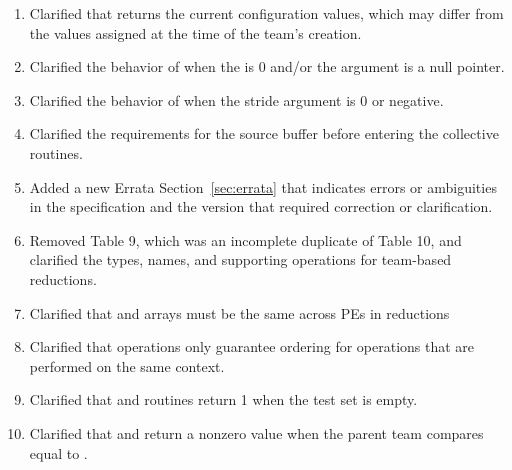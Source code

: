 \begin{enumerate}
%
\item Clarified that  returns the current
    configuration values, which may differ from the values assigned at the
        time of the team's creation.
%
\item Clarified the behavior of  when the
     is 0 and/or the  argument is a null pointer.
%
\item Clarified the behavior of  when the
    stride argument is 0 or negative.
%
\item Clarified the requirements for the source buffer before entering the
    collective routines.
%
\item Added a new Errata Section~\ref{sec:errata} that indicates errors or ambiguities in the
    \openshmem specification and the version that required correction or clarification.
%
\item Removed \openshmem[1.5] Table 9, which was an incomplete duplicate of
    \openshmem[1.5] Table 10, and clarified the types, names, and supporting
    operations for team-based reductions. \label{changelog:reduction_table}
%
%
\item Clarified that  and  arrays must be the same
    across \acp{PE} in \openshmem reductions \label{changelog:reduction_args}
%
\item Clarified that  operations only guarantee ordering for
    operations that are performed on the same context. \label{changelog:fence_ctx}
%
%
\item Clarified that  and 
    routines return 1 when the test set is empty. \label{changelog:test_all}
%
%
\item Clarified that  and
     return a nonzero value when the parent
        team compares equal to . \label{changelog:split_strided_2d}
%

\end{enumerate}
